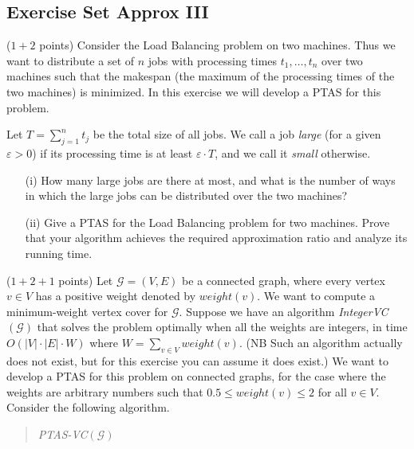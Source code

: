\documentclass{article}
\newcommand{\G}{\ensuremath{\mathcal{G}}}
\newcommand{\graph}{\G}
\newcommand{\loadb}{{\sc Load Balancing}\xspace}
\newcommand{\eps}{\varepsilon}
\renewcommand{\leq}{\leqslant}
\newcommand{\weight}{\mathit{weight}}
\newcounter{rcounter}
\newenvironment{rlist}%
{\begin{list}{\setnr-\arabic{rcounter}}{\usecounter{rcounter}}}{\end{list}}
\begin{document}
	\subsection*{Exercise Set Approx III}
	\begin{rlist}
		\item ($1+2$ points)
		Consider the \loadb problem on two machines.
		Thus we want to distribute a set of $n$ jobs with
		processing times $t_1,\ldots,t_n$ over two machines such that the makespan (the maximum of the
		processing times of the two machines) is minimized.
		In this exercise we will develop a PTAS for this problem.
		
		Let $T=\sum_{j=1}^n t_j$ be the total size of all jobs.
		We call a job \emph{large} (for a given $\eps>0$) if its processing time is at
		least $\eps \cdot T$, and we call it \emph{small} otherwise.
		\begin{enumerate}
			\item[(i)] How many large jobs are there at most, and what is the number of ways in which the
			large jobs can be distributed over the two machines?
			\item[(ii)] Give a PTAS for the \loadb problem for two machines. Prove that your algorithm
			achieves the required approximation ratio and analyze its running time.
		\end{enumerate}
		\item ($1 + 2 + 1$ points)
		Let $\graph=(V,E)$ be a connected graph, where every vertex $v\in V$ 
		has a positive weight denoted by $\weight(v)$. We want to compute a 
		minimum-weight vertex cover for $\graph$.
		Suppose we have an algorithm \emph{IntegerVC}$(\graph)$ that solves the problem optimally when all the weights are integers, in time $O( |V|\cdot |E|\cdot W)$ where $W = \sum_{v\in V} \weight(v)$.
		(NB Such an algorithm actually does not exist, but for this exercise you can assume it does exist.)
		We want to develop a PTAS for this problem on connected graphs, for the case where the weights are arbitrary numbers such that $0.5 \leq \weight(v) \leq 2$ for all $v\in V$.
		Consider the following algorithm.
		\begin{algorithm}
			\vspace*{2mm}
			\begin{quotation}
				\noindent
				\emph{PTAS-VC}$(\graph)$ \\

\end{quotation}
\end{algorithm}
\end{rlist}
\end{document}
